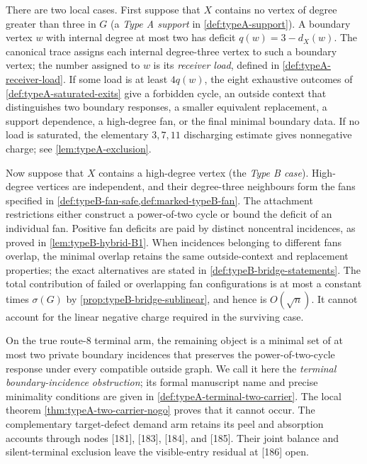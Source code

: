 \documentclass[11pt]{article}
\begin{document}
There are two local cases.  First suppose that $X$ contains no vertex of
degree greater than three in $G$ (a \emph{Type A support} in
\cref{def:typeA-support}).  A boundary vertex $w$ with internal degree at most
two has deficit $q(w)=3-d_X(w)$.  The canonical trace assigns each internal
degree-three vertex to such a boundary vertex; the number assigned to $w$ is
its \emph{receiver load}, defined in \cref{def:typeA-receiver-load}.  If some
load is at least $4q(w)$, the eight exhaustive outcomes of
\cref{def:typeA-saturated-exits} give a forbidden cycle, an outside context
that distinguishes two boundary responses, a smaller equivalent replacement,
a support dependence, a high-degree fan, or the final minimal boundary data.
If no load is saturated, the elementary $3,7,11$ discharging estimate gives
nonnegative charge; see \cref{lem:typeA-exclusion}.

Now suppose that $X$ contains a high-degree vertex (the \emph{Type B case}).
High-degree vertices are independent, and their degree-three neighbours form
the fans specified in \cref{def:typeB-fan-safe,def:marked-typeB-fan}.  The
attachment restrictions either construct a power-of-two cycle or bound the
deficit of an individual fan.  Positive fan deficits are paid by distinct
noncentral incidences, as proved in \cref{lem:typeB-hybrid-B1}.  When incidences
belonging to different fans overlap, the minimal overlap retains the same
outside-context and replacement properties; the exact alternatives are stated
in \cref{def:typeB-bridge-statements}.  The total contribution of failed or
overlapping fan configurations is at most a constant times $\sigma(G)$ by
\cref{prop:typeB-bridge-sublinear}, and hence is $O(\!\sqrt n)$.  It cannot
account for the linear negative charge required in the surviving case.

On the true route-8 terminal arm, the remaining object is a minimal set of at most
two private boundary incidences that preserves the power-of-two-cycle response
under every compatible outside graph.  We call it here the \emph{terminal
boundary-incidence obstruction}; its formal manuscript name and precise
minimality conditions are given in \cref{def:typeA-terminal-two-carrier}.  The
local theorem \cref{thm:typeA-two-carrier-nogo} proves that it cannot occur.
The complementary target-defect demand arm retains its peel and absorption
accounts through nodes [181], [183], [184], and [185].  Their joint balance
and silent-terminal exclusion leave the visible-entry residual at [186] open.
\end{document}
